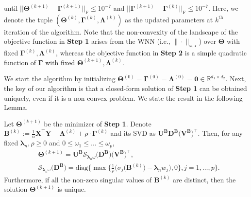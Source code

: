 \documentclass[alpha-refs]{wiley-article}
\begin{document}
until $|| \boldsymbol{\Theta}^{(k+1)}-\boldsymbol{\Gamma}^{(k+1)} ||_{\text{F}}\leq 10^{-7}$ and $|| \boldsymbol{\Gamma}^{(k+1)}-\boldsymbol{\Gamma}^{(k)} ||_{\text{F}}\leq 10^{-7}$.
Here, we denote the tuple $(\boldsymbol{\Theta}^{(k)},\boldsymbol{\Gamma}^{(k)},\boldsymbol{\Lambda}^{(k)})$ as the updated parameters at $k^{\text{th}}$ iteration of the algorithm.
Note that the non-convexity of the landscape of the objective function in \textbf{Step 1} arises from the WNN  (i.e., $\|\cdot\|_{\omega,\star}$) over $\boldsymbol{\Theta}$ with fixed $\boldsymbol{\Gamma}^{(k)},\boldsymbol{\Lambda}^{(k)}$, whereas the objective function in \textbf{Step 2} is a simple quadratic function of $\boldsymbol{\Gamma}$ with fixed $\boldsymbol{\Theta}^{(k+1)},\boldsymbol{\Lambda}^{(k)}$. 

We start the algorithm by initializing  $\boldsymbol{\Theta}^{(0)}=\boldsymbol{\Gamma}^{(0)}=\boldsymbol{\Lambda}^{(0)}=\boldsymbol{0} \in\mathbb{R}^{d_{1}\times d_{2}}$.
Next, the key of our algorithm is that a closed-form solution of \textbf{Step 1} can be obtained uniquely, even if it is a non-convex problem. 
We state the result in the following Lemma.
\begin{lemma} \label{Lemma2.1}
    Let $\boldsymbol{\Theta}^{(k+1)}$ be the minimizer of \textbf{Step 1}.
    Denote $\boldsymbol{B}^{(k)}:=\frac{1}{n}\boldsymbol{X}^{\top}\boldsymbol{Y}-\boldsymbol{\Lambda}^{(k)}+\rho \cdot \boldsymbol{\Gamma}^{(k)}$ and its SVD as $\boldsymbol{U}^{\textbf{B}}\boldsymbol{D}^{\textbf{B}}\big(\boldsymbol{V}^{\textbf{B}}\big)^{\top}$.
    Then, for any fixed $\boldsymbol{\lambda}_{n}, \rho \geq 0 $ and $0\leq \omega_{1} \leq \dots \leq \omega_{p}$, 
    \begin{align*}
        &\boldsymbol{\Theta}^{(k+1)} = \boldsymbol{U}^{\textbf{B}}\mathcal{S}_{\boldsymbol{\lambda}_{n}\omega}\big(\boldsymbol{D}^{\textbf{B}}\big)\big(\boldsymbol{V}^{\textbf{B}}\big)^{\top}, \\ 
        &\mathcal{S}_{\boldsymbol{\lambda}_{n}\omega}\big(\boldsymbol{D}^{\textbf{B}}\big) = \text{diag}\bigg\{ \max\bigg\{\frac{1}{\rho}\big(\sigma_{j}(\boldsymbol{B}^{(k)}\big)-\boldsymbol{\lambda}_{n} w_{j}\big),0 \bigg\},  j=1,\dots,p \bigg\}.
    \end{align*}
    Furthermore, if all the non-zero singular values of $\boldsymbol{B}^{(k)}$ are distinct, then the solution $\boldsymbol{\Theta}^{(k+1)}$ is unique.
\end{lemma}
\end{document}
